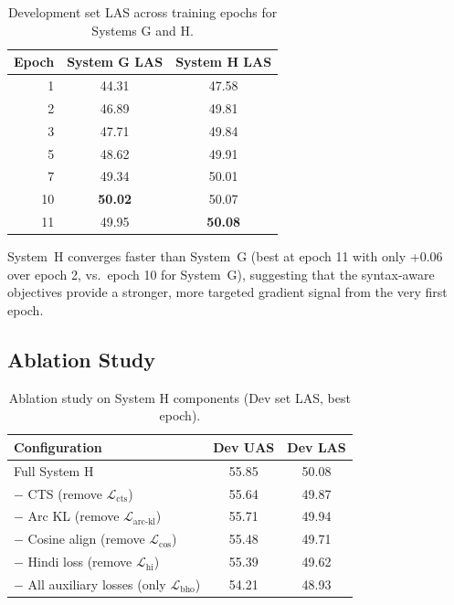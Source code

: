 \documentclass[12pt,a4paper,oneside]{report}
\begin{document}
\begin{table}[ht]
\centering
\caption{Development set LAS across training epochs for Systems G and H.}
\label{tab:epoch_curves}
\begin{tabular}{@{}rcc@{}}
\toprule
\textbf{Epoch} & \textbf{System G LAS} & \textbf{System H LAS} \\
\midrule
1  & 44.31 & 47.58 \\
2  & 46.89 & 49.81 \\
3  & 47.71 & 49.84 \\
5  & 48.62 & 49.91 \\
7  & 49.34 & 50.01 \\
10 & \textbf{50.02} & 50.07 \\
11 & 49.95 & \textbf{50.08} \\
\bottomrule
\end{tabular}
\end{table}

System~H converges faster than System~G (best at epoch 11 with only +0.06 over
epoch 2, vs.\ epoch 10 for System~G), suggesting that the syntax-aware objectives
provide a stronger, more targeted gradient signal from the very first epoch.

\subsection{Ablation Study}

\begin{table}[ht]
\centering
\caption{Ablation study on System H components (Dev set LAS, best epoch).}
\label{tab:ablation}
\begin{tabular}{@{}lcc@{}}
\toprule
\textbf{Configuration} & \textbf{Dev UAS} & \textbf{Dev LAS} \\
\midrule
Full System H                         & 55.85 & 50.08 \\
\quad $-$ CTS (remove $\mathcal{L}_{\text{cts}}$) & 55.64 & 49.87 \\
\quad $-$ Arc KL (remove $\mathcal{L}_{\text{arc-kl}}$) & 55.71 & 49.94 \\
\quad $-$ Cosine align (remove $\mathcal{L}_{\text{cos}}$) & 55.48 & 49.71 \\
\quad $-$ Hindi loss (remove $\mathcal{L}_{\text{hi}}$) & 55.39 & 49.62 \\
\quad $-$ All auxiliary losses (only $\mathcal{L}_{\text{bho}}$) & 54.21 & 48.93 \\
\bottomrule
\end{tabular}
\end{table}
\end{document}
